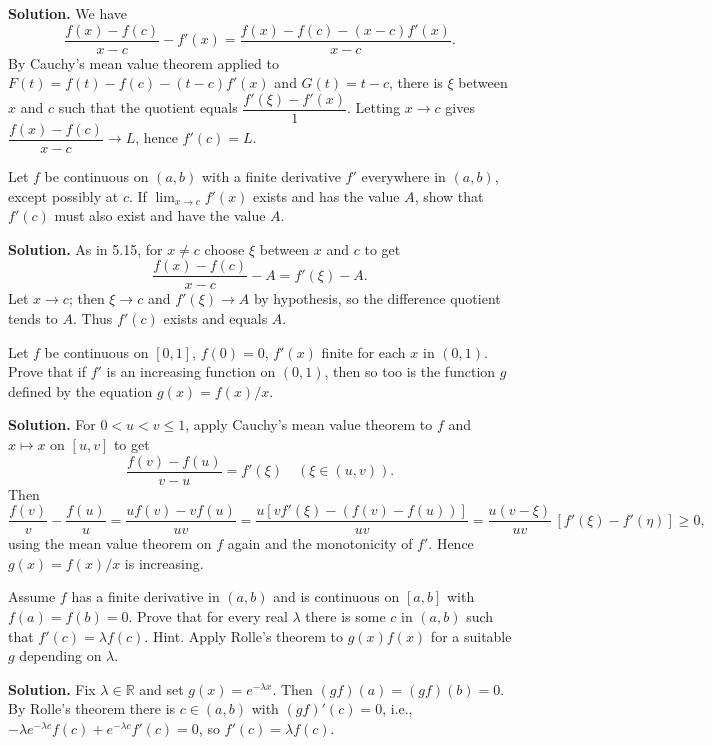 \noindent\textbf{Solution.}
We have
\[\frac{f(x)-f(c)}{x-c}-f'(x)=\frac{f(x)-f(c)-(x-c)f'(x)}{x-c}.\]
By Cauchy’s mean value theorem applied to $F(t)=f(t)-f(c)-(t-c)f'(x)$ and $G(t)=t-c$, there is $\xi$ between $x$ and $c$ such that the quotient equals $\dfrac{f'(\xi)-f'(x)}{1}$. Letting $x\to c$ gives $\dfrac{f(x)-f(c)}{x-c}\to L$, hence $f'(c)=L$.

\begin{problembox}
Let \( f \) be continuous on \( (a, b) \) with a finite derivative \( f' \) everywhere in \( (a, b) \), except possibly at \( c \). If \( \lim_{x \to c} f'(x) \) exists and has the value \( A \), show that \( f'(c) \) must also exist and have the value \( A \).
\end{problembox}

\noindent\textbf{Solution.}
As in 5.15, for $x\ne c$ choose $\xi$ between $x$ and $c$ to get
\[\frac{f(x)-f(c)}{x-c}-A=f'(\xi)-A.\]
Let $x\to c$; then $\xi\to c$ and $f'(\xi)\to A$ by hypothesis, so the difference quotient tends to $A$. Thus $f'(c)$ exists and equals $A$.

\begin{problembox}
Let \( f \) be continuous on \( [0, 1] \), \( f(0) = 0 \), \( f'(x) \) finite for each \( x \) in \( (0, 1) \). Prove that if \( f' \) is an increasing function on \( (0, 1) \), then so too is the function \( g \) defined by the equation \( g(x) = f(x)/x \).
\end{problembox}

\noindent\textbf{Solution.}
For $0<u<v\le 1$, apply Cauchy’s mean value theorem to $f$ and $x\mapsto x$ on $[u,v]$ to get
\[\frac{f(v)-f(u)}{v-u}=f'(\xi)\quad(\xi\in(u,v)).\]
Then
\[\frac{f(v)}{v}-\frac{f(u)}{u}=\frac{uf(v)-vf(u)}{uv}=\frac{u[v f'(\xi)-(f(v)-f(u))]}{uv}=\frac{u(v-\xi)}{uv}\,[f'(\xi)-f'(\eta)]\ge 0,\]
using the mean value theorem on $f$ again and the monotonicity of $f'$. Hence $g(x)=f(x)/x$ is increasing.

\begin{problembox}
Assume \( f \) has a finite derivative in \( (a, b) \) and is continuous on \( [a, b] \) with \( f(a) = f(b) = 0 \). Prove that for every real \( \lambda \) there is some \( c \) in \( (a, b) \) such that \( f'(c) = \lambda f(c) \). Hint. Apply Rolle's theorem to \( g(x)f(x) \) for a suitable \( g \) depending on \( \lambda \).
\end{problembox}

\noindent\textbf{Solution.}
Fix $\lambda\in\mathbb{R}$ and set $g(x)=e^{-\lambda x}$. Then $(gf)(a)=(gf)(b)=0$. By Rolle’s theorem there is $c\in(a,b)$ with $(gf)'(c)=0$, i.e., $-\lambda e^{-\lambda c}f(c)+e^{-\lambda c}f'(c)=0$, so $f'(c)=\lambda f(c)$.

